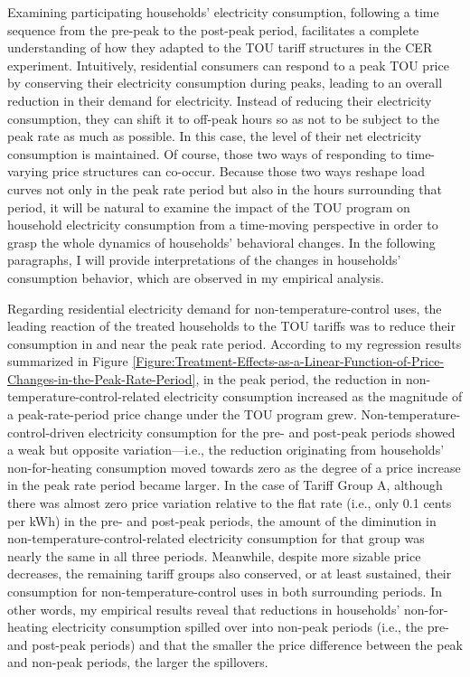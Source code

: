 Examining participating households' electricity consumption, following a time sequence from the pre-peak to the post-peak period, facilitates a complete understanding of how they adapted to the TOU tariff structures in the CER experiment. Intuitively, residential consumers can respond to a peak TOU price by conserving their electricity consumption during peaks, leading to an overall reduction in their demand for electricity. Instead of reducing their electricity consumption, they can shift it to off-peak hours so as not to be subject to the peak rate as much as possible. In this case, the level of their net electricity consumption is maintained. Of course, those two ways of responding to time-varying price structures can co-occur. Because those two ways reshape load curves not only in the peak rate period but also in the hours surrounding that period, it will be natural to examine the impact of the TOU program on household electricity consumption from a time-moving perspective in order to grasp the whole dynamics of households' behavioral changes. In the following paragraphs, I will provide interpretations of the changes in households' consumption behavior, which are observed in my empirical analysis. 

Regarding residential electricity demand for non-temperature-control uses, the leading reaction of the treated households to the TOU tariffs was to reduce their consumption in and near the peak rate period. According to my regression results summarized in Figure \ref{Figure:Treatment-Effects-as-a-Linear-Function-of-Price-Changes-in-the-Peak-Rate-Period}, in the peak period, the reduction in non-temperature-control-related electricity consumption increased as the magnitude of a peak-rate-period price change under the TOU program grew. Non-temperature-control-driven electricity consumption for the pre- and post-peak periods showed a weak but opposite variation---i.e., the reduction originating from households' non-for-heating consumption moved towards zero as the degree of a price increase in the peak rate period became larger. In the case of Tariff Group A, although there was almost zero price variation relative to the flat rate (i.e., only 0.1 cents per kWh) in the pre- and post-peak periods, the amount of the diminution in non-temperature-control-related electricity consumption for that group was nearly the same in all three periods. Meanwhile, despite more sizable price decreases, the remaining tariff groups also conserved, or at least sustained, their consumption for non-temperature-control uses in both surrounding periods. In other words, my empirical results reveal that reductions in households' non-for-heating electricity consumption spilled over into non-peak periods (i.e., the pre- and post-peak periods) and that the smaller the price difference between the peak and non-peak periods, the larger the spillovers. 

